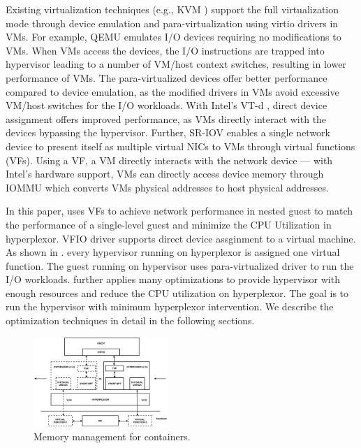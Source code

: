 Existing virtualization techniques (e.g., KVM \cite{kivity2007kvm}) support the full virtualization mode through device emulation \cite{sugerman2001virtualizing} and para-virtualization using virtio drivers \cite{russell2008virtio, barham2003xen}  in VMs. 
For example, QEMU \cite{bellard2005qemu} emulates I/O devices requiring no modifications to VMs. When VMs access the devices, the I/O instructions are trapped into hypervisor leading to a number of VM/host context switches, resulting in lower performance of VMs. The para-virtualized devices offer better performance compared to device emulation, as the modified drivers in VMs avoid excessive VM/host switches for the I/O workloads. With Intel's VT-d \cite{abramson2006intel}, direct device assignment offers improved performance, as VMs directly interact with the devices bypassing the hypervisor.    
Further, SR-IOV \cite{dong2008sr} enables a single network device to present itself as multiple virtual NICs to VMs through virtual functions (VFs). Using a VF, a VM directly interacts with the network device --- with Intel's hardware support, VMs can directly access device memory through IOMMU which converts VMs physical addresses to host physical addresses.

In this paper, \arch uses VFs to achieve network performance in nested guest to match the performance of a single-level guest and minimize the CPU Utilization in hyperplexor. VFIO \cite{vfiodriver} driver supports direct device assginment to a virtual machine. As shown in . every hypervisor running on hyperplexor is assigned one virtual function. The guest running on hypervisor uses para-virtualized driver to run the I/O workloads. \arch further applies many optimizations to provide hypervisor with enough resources and reduce the CPU utilization on hyperplexor. The goal is to run the hypervisor with minimum hyperplexor intervention. We describe the optimization techniques in detail in the following sections.

\begin{figure}[t!]
 	  \includegraphics[width=0.45\textwidth]{figures/architecture_modified.pdf}
  \caption{Memory management for containers.}
  \label{fig:vFresharch}
\end{figure}

